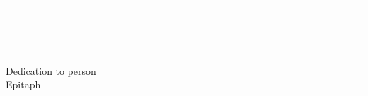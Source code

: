 \newpage
\vspace*{\fill}
\begin{center}
\begin{minipage}{0.75\textwidth}
    \centering
    \large

    \lipsum[1][1] \\[3 mm]

    {\LARGE
    \kern-2mm
    \rule[2.645mm]{2.25cm}{0.7pt}
    \
    \rule[2.645mm]{2.25cm}{0.7pt}
    \kern-2mm
    } \\

    Dedication to person \\
    Epitaph
\end{minipage}
\end{center}
\vspace*{\fill}

\blankpage{}
